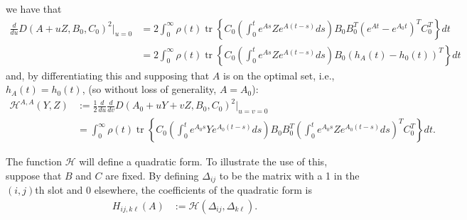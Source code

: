 \documentclass{article}
\newcommand{\tr}{\mathop{\mbox{tr}}} %
\newcommand{\calH}{\mathcal{H}}
\newcommand{\1}{\mathbbm{1}}
\begin{document}
we have that
\begin{equation}
  \begin{aligned}
      \frac{d}{du} D(A+uZ,B_0,C_0)^2 \vert_{u=0}
      &=
        2 \int_0^\infty \rho(t) \tr\left\{ C_0 \left( \int_0^t e^{As} Z e^{A(t-s)} ds \right) B_0 B_0^T \left( e^{At} - e^{A_0 t} \right)^T C_0^T \right\} dt \\
      &=
        2 \int_0^\infty \rho(t) \tr\left\{ C_0 \left( \int_0^t e^{As} Z e^{A(t-s)} ds \right) B_0 \left( h_A(t) - h_0(t) \right)^T \right\} dt 
  \end{aligned}
\end{equation}
and, by differentiating this and supposing that $A$ is on the optimal set,
i.e., $h_A(t)=h_0(t)$, (so without loss of generality, $A=A_0$):
\begin{equation}
  \begin{aligned}
      \calH^{A,A}(Y,Z) 
      &:= 
      \frac{1}{2} \frac{d}{du} \frac{d}{dv} D(A_0+uY+vZ,B_0,C_0)^2 \vert_{u=v=0} \\
      &=
        \int_0^\infty \rho(t) \tr\left\{ C_0 
        \left( \int_0^t e^{A_0 s} Y e^{A_0 (t-s)} ds \right) 
        B_0 B_0^T 
        \left( \int_0^t e^{A_0 s} Z e^{A_0 (t-s)} ds \right)^T
        C_0^T \right\} dt  .
  \end{aligned}
\end{equation}

The function $\calH$ will define a quadratic form.
To illustrate the use of this, suppose that $B$ and $C$ are fixed.
By defining $\Delta_{ij}$ to be the matrix with a 1 in the $(i,j)$th slot
and 0 elsewhere,
the coefficients of the quadratic form is
\begin{equation}
    \begin{aligned}
        H_{ij, k\ell}(A)
        &:=
        \calH(\Delta_{ij}, \Delta_{k\ell}) .
    \end{aligned}
\end{equation}
\end{document}
